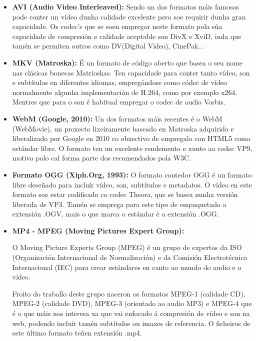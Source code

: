         \begin{itemize}
        \item \textbf{AVI (Audio Video Interleaved):} 
            Sendo un dos formatos máis famosos pode conter un vídeo dunha calidade excelente pero
            soe requirir dunha gran capacidade. Os codec's que se soen empregar neste formato pola 
            súa capacidade de compresión e calidade aceptable son DivX e XviD, inda que tamén se 
            permiten outros como DV(Digital Video), CinePak... 
            
        \item \textbf{MKV (Matroska):}
            É un formato de código aberto que basea o seu nome nas clásicas bonecas Matrioskas. Ten
            capacidade para conter tanto vídeo, son e subtítulos en diferentes idiomas, empregándose
            como códec de vídeo normalmente algunha implementación de H.264, como por exemplo x264. 
            Mentres que para o son é habitual empregar o codec de audio Vorbis.

        \item \textbf{ WebM (Google, 2010):}
            Un dos formatos máis recentes é o WebM (WebMovie), un proxecto lixeiramente baseado en 
            Matroska adquirido e liberalizado por Google en 2010 co obxectivo de empregalo con HTML5
            como estándar libre. O formato ten un excelente rendemento e xunto ao codec VP9, motivo
            polo cal forma parte dos recomendados pola W3C.
            
        \item \textbf{Formato OGG (Xiph.Org, 1993):} 
            O formato contedor OGG é un formato libre deseñado para incluír vídeo, son, 
            subtítulos e metadatos. O vídeo en este formato soe estar codificado co codec Theora, 
            que se basea nunha versión liberada de VP3. Tamén se emprega para este tipo de 
            empaquetado a extensión .OGV, mais o que marca o estándar é a extensión .OGG.  
            
        \item \textbf{MP4 - MPEG (Moving Pictures Expert Group):}
        
        O  Moving Picture Experts Group (MPEG) é un grupo de expertos da ISO (Organización 
        Internacional de Normalización) e da Comisión Electrotécnica Internacional (IEC) para
        crear estándares en canto ao mundo do audio e o vídeo.
        
        Froito do traballo deste grupo naceron os formatos MPEG-1 (calidade CD), MPEG-2 (calidade 
        DVD), MPEG-3 (orientado ao audio MP3) e MPEG-4 que é o que máis nos interesa xa que vai 
        enfocado á compresión de vídeo e son na web, podendo incluír tamén subtítulos ou imaxes de 
        referencia. O ficheiros de este último formato teñen extensión .mp4.

        \end{itemize}


